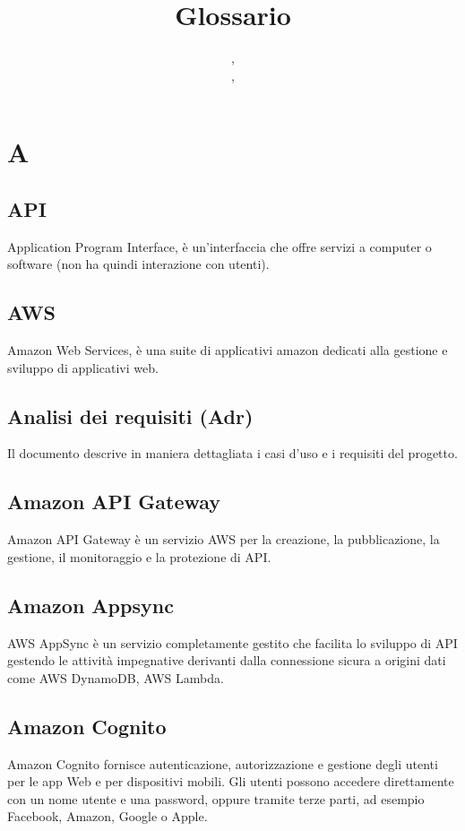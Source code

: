 \documentclass{classes/base}
\title{Glossario}
\author{\giulio, \\ \angela, \\ \marcob}
\begin{document}
	\maketitle
	\newpage
	\tableofcontents

    \section{A}
        \subsection*{API}
        Application Program Interface, è un'interfaccia che offre servizi a computer o software (non ha quindi interazione con utenti).
       
        \subsection*{AWS}
        \label{sec:AWS}
        Amazon Web Services, è una suite di applicativi amazon dedicati alla gestione e sviluppo di applicativi web.

        \subsection*{Analisi dei requisiti (Adr)}
        Il documento descrive in maniera dettagliata i casi d’uso e i requisiti del progetto.

        \subsection*{Amazon API Gateway}
        Amazon API Gateway è un servizio AWS per la creazione, la pubblicazione, la gestione, il monitoraggio e la protezione di API.

        \subsection*{Amazon Appsync}
        AWS AppSync è un servizio completamente gestito che facilita lo sviluppo di API gestendo le attività impegnative derivanti dalla connessione sicura a origini dati come AWS DynamoDB, AWS Lambda.

        \subsection*{Amazon Cognito}
        Amazon Cognito fornisce autenticazione, autorizzazione e gestione degli utenti per le app Web e per dispositivi mobili. Gli utenti possono accedere direttamente con un nome utente e una password, oppure tramite terze parti, ad esempio Facebook, Amazon, Google o Apple.
        
\end{document}
